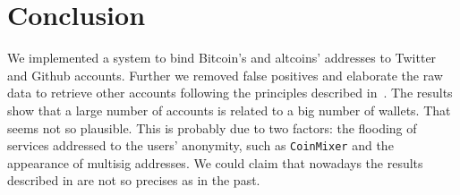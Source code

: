 \section{Conclusion} \label{conclusion}
We implemented a system to bind Bitcoin's and altcoins' addresses to Twitter
and Github accounts. Further we removed false positives and elaborate the raw
data to retrieve other accounts following the principles described in~\cite{bib:fistful}.
The results show that a large number of accounts is related to a big number of
wallets. That seems not so plausible. This is probably due to two factors: the
flooding of services addressed to the users' anonymity, such as
\texttt{CoinMixer} and the appearance of multisig addresses. We could claim
that nowadays the results described in \cite{bib:fistful} are not so precises as in the past.